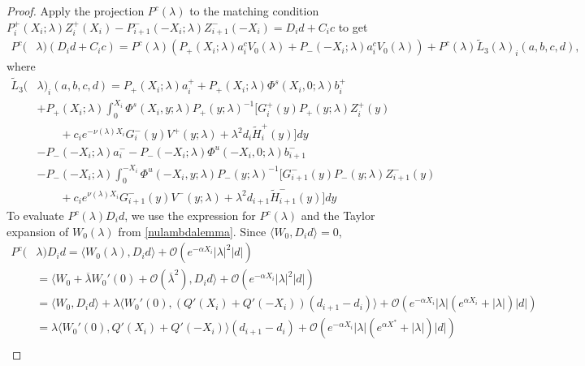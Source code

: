 \documentclass[thesis.tex]{subfiles}
\begin{document}
\begin{lemma}
\begin{proof}
Apply the projection $P^c(\lambda)$ to the matching condition $P_i^+(X_i; \lambda) Z_i^+(X_i) - P_{i+1}^-(-X_i; \lambda) Z_{i+1}^-(-X_i) = D_i d + C_i c$ to get
\begin{equation}\label{Dideq0c}
\begin{aligned}
P^c(&\lambda)(D_i d + C_i c) = P^c(\lambda)( P_+(X_i; \lambda) a_i^c V_0(\lambda) + P_-(-X_i; \lambda)a_i^c V_0(\lambda)) + P^c(\lambda) \tilde{L}_3(\lambda)_i(a,b,c,d),
\end{aligned}
\end{equation}
where
\begin{equation}\label{tildeL3}
\begin{aligned}
\tilde{L}_3(&\lambda)_i(a,b,c,d) = P_+(X_i; \lambda)a_i^+ + P_+(X_i; \lambda)\Phi^s(X_i, 0; \lambda) b_i^+ \\
&+ P_+(X_i; \lambda) \int_0^{X_i} \Phi^s(X_i, y; \lambda) P_+(y; \lambda)^{-1}\big[ G_i^+(y) P_+(y; \lambda) Z_i^+(y) \\
&\qquad+ c_i e^{-\nu(\lambda)X_i} G_i^-(y) V^+(y; \lambda) + \lambda^2 d_i \tilde{H}_i^+(y)\big] dy \\
&- P_-(-X_i; \lambda)a_i^-  - P_-(-X_i; \lambda)\Phi^u(-X_i, 0; \lambda) b_{i+1}^- \\ 
&- P_-(-X_i; \lambda) \int_0^{-X_i} \Phi^u(-X_i, y; \lambda) P_-(y; \lambda)^{-1}\big[ G_{i+1}^-(y) P_-(y; \lambda)Z_{i+1}^-(y) \\
&\qquad+ c_i e^{\nu(\lambda)X_i} G_{i+1}^-(y) V^-(y; \lambda) + \lambda^2 d_{i+1} \tilde{H}_{i+1}^-(y)\big] dy
\end{aligned}
\end{equation}
To evaluate $P^c(\lambda)D_i d$, we use the expression for $P^c(\lambda)$ and the Taylor expansion of $W_0(\lambda)$ from \cref{nulambdalemma}. Since $\langle W_0, D_i d \rangle = 0$,
\begin{align*}
P^c(&\lambda)D_i d = \langle W_0(\lambda), D_i d \rangle + \mathcal{O}(e^{-\alpha X_i} |\lambda|^2 |d| ) \\
&= \langle W_0 + \overline{\lambda} W_0'(0) + \mathcal{O}(\overline{\lambda}^2), D_i d \rangle + \mathcal{O}(e^{-\alpha X_i} |\lambda|^2 |d| ) \\
&= \langle W_0, D_i d \rangle + \lambda \langle W_0'(0), (Q'(X_i) + Q'(-X_i))(d_{i+1} - d_i ) \rangle + \mathcal{O}(e^{-\alpha X_i} |\lambda|(e^{\alpha X_i} + |\lambda|)|d|) \\
&= \lambda \langle W_0'(0), Q'(X_i) + Q'(-X_i) \rangle (d_{i+1} - d_i ) + \mathcal{O}(e^{-\alpha X_i} |\lambda|(e^{\alpha X^*} + |\lambda|)|d|) \\

\end{align*}
\end{proof}
\end{lemma}
\end{document}
